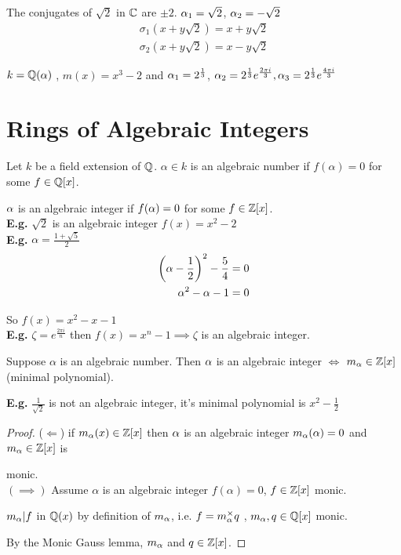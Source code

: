 \documentclass[11pt]{article}
\begin{document}
The conjugates of $\sqrt{2}$ in $\mathbb{C}$ are $\pm 2$. 
$\alpha_1 = \sqrt{2}$,
$\alpha_2 = -\sqrt{2}$
\begin{align*}
	\sigma_1(x+y\sqrt{2}) = x +y\sqrt{2} \\
	\sigma_2(x+y\sqrt{2}) = x - y\sqrt{2}
\end{align*}

$k = \mathbb{Q}(\alpha)$ , $m(x) = x^3 - 2$ and $\alpha_1 = 2^{\frac{1}{3}}$, $\alpha_2 = 2^{\frac{1}{3}}e^{\frac{2\pi i}{3}} ,\alpha_3 = 2^{\frac{1}{3}} e^{\frac{4\pi i }{3}}$

\newpage
\section{Rings of Algebraic Integers}

\begin{defn}
	Let $k$ be a field extension of $\mathbb{Q}$.
	$\alpha \in k$ is an algebraic number if $f(\alpha)=0 $ for some $f \in \mathbb{Q}[x]$.
\end{defn}
$ $\\[-.5em]
$\alpha$ is an algebraic integer if $f(\alpha) = 0 $ for some $f \in \mathbb{Z}[x]$.
$ $\\[1em]
\textbf{E.g.} $\sqrt{2}$ is an algebraic integer $f(x) =x^2 -2$\\
\textbf{E.g.} $\alpha = \frac{1+\sqrt{5}}{2}$
\begin{align*}
	\bigg(\alpha - \frac{1}{2}\bigg)^2  - \frac{5}{4} &= 0\\
	\alpha^2 - \alpha -1 & =0\\
\end{align*}

So $f(x) = x^2 - x-1$
$ $\\[1em]
\textbf{E.g.} $\zeta = e^{\frac{2\pi i}{n}}$ then $f(x) = x^n - 1 \implies \zeta$ is an algebraic integer.

\begin{prop}
	Suppose $\alpha$ is an algebraic number. 
	Then $\alpha$ is an algebraic integer $\iff$ $m_\alpha \in \mathbb{Z}[x] $ (minimal polynomial).
\end{prop}
$ $\\[-0.5em] 
\textbf{E.g.} $\frac{1}{\sqrt{2}}$ is not an algebraic integer, it's minimal polynomial is $x^2 - \frac{1}{2}$

\begin{proof}
	($\Longleftarrow$) if $m_\alpha(x) \in \mathbb{Z}[x] $ then $\alpha$ is an algebraic integer $m_\alpha(\alpha) = 0$ and $m_\alpha \in \mathbb{Z}[x]$ is
	
	monic.
$ $\\
	$(\implies)$ Assume $\alpha$ is an algebraic integer $f(\alpha) = 0 $, $f \in \mathbb{Z}[x]$ monic.

	$m_\alpha  | f $ in $\mathbb{Q}(x) $ by definition of $m_\alpha$, i.e. $f = m_\alpha^\times q$ , $m_\alpha, q \in \mathbb{Q}[x] $ monic.

	By the Monic Gauss lemma, $m_\alpha$ and $q \in \mathbb{Z}[x]$. 
\end{proof}
\end{document}
